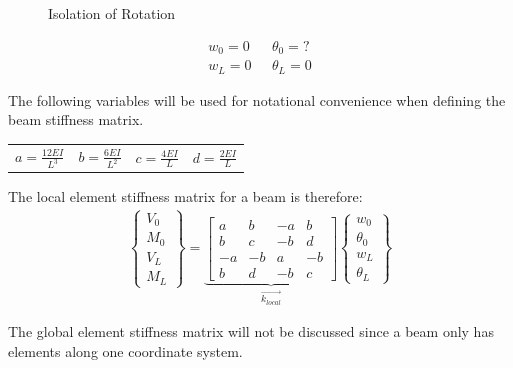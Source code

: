 \begin{figure}[h]
\begin{center}
\caption{Isolation of Rotation}
\label{Fig:BeamIso2}
\end{center}
\end{figure}


\begin{align*}
	w_0=0 & \text{	} \theta_0=?\\
	w_L=0 &\text{	}  \theta_L=0
\end{align*}

The following variables will be used for notational convenience when defining the beam stiffness matrix.

\begin{center}
	\begin{tabular}{cccc}
		$a=\frac{12EI}{L^3}$ & $b=\frac{6EI}{L^2}$ & $c=\frac{4EI}{L}$ & $d=\frac{2EI}{L}$
	\end{tabular}
\end{center}

The local element stiffness matrix for a beam is therefore:
\begin{align}
	\begin{Bmatrix}
		V_0\\ M_0\\ \hline V_L\\ M_L
	\end{Bmatrix}
	=
  \underbrace{
	\left[
	\begin{array}{cc|cc}
		a & b & -a & b\\
		b & c & -b & d\\ \hline
		-a & -b & a & -b\\
		b & d & -b & c
	\end{array}
	\right]
  }_{\vec{k_{local}}}
	\begin{Bmatrix}
		w_0\\ \theta_0\\ \hline w_L\\ \theta_L
	\end{Bmatrix}
\end{align}

The global element stiffness matrix will not be discussed since a beam only has elements along one coordinate system. 